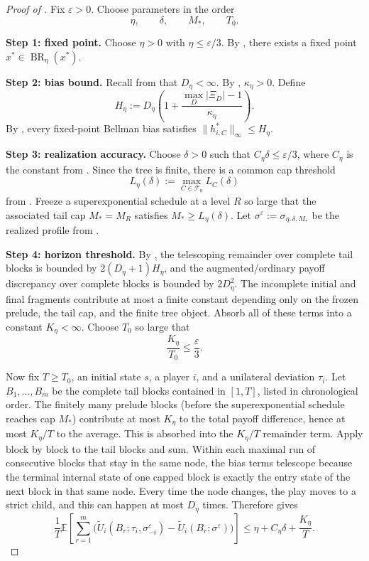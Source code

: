 \documentclass[12pt]{article}
\theoremstyle{definition}
\newcommand{\eps}{\varepsilon}
\newcommand{\E}{\mathbb{E}}
\newcommand{\1}{\mathbf{1}}
\newcommand{\cT}{\mathcal{T}}
\DeclareMathOperator{\BR}{BR}
\begin{document}
\begin{proof}[Proof of ]
Fix $\eps>0$. Choose parameters in the order
\[
\eta,\qquad \delta,\qquad M_*,\qquad T_0.
\]

\smallskip
\noindent\textbf{Step 1: fixed point.}
Choose $\eta>0$ with $\eta\le \eps/3$. By
, there exists a fixed point $x^*\in\BR_\eta(x^*)$.

\smallskip
\noindent\textbf{Step 2: bias bound.}
Recall from  that $D_\eta<\infty$. By
, $\kappa_\eta>0$. Define
\[
H_\eta:=D_\eta\left(1+\frac{\max_D|\Xi_D|-1}{\kappa_\eta}\right).
\]
By , every fixed-point Bellman bias satisfies
$\|h_{i,C}^*\|_\infty\le H_\eta$.

\smallskip
\noindent\textbf{Step 3: realization accuracy.}
Choose $\delta>0$ such that $C_\eta\delta\le \eps/3$, where $C_\eta$ is the
constant from . Since the tree is finite, there is a common
cap threshold
\[
L_\eta(\delta):=\max_{C\in\cT_\eta}L_C(\delta)
\]
from . Freeze a superexponential schedule at a level
$R$ so large that the associated tail cap $M_*=M_R$ satisfies
$M_*\ge L_\eta(\delta)$. Let
$\sigma^\eps:=\sigma_{\eta,\delta,M_*}$ be the realized profile from
.

\smallskip
\noindent\textbf{Step 4: horizon threshold.}
By , the telescoping remainder over complete tail blocks is
bounded by $2(D_\eta+1)H_\eta$, and the augmented/ordinary payoff discrepancy over
complete blocks is bounded by $2D_\eta^2$. The incomplete initial and final
fragments contribute at most a finite constant depending only on the frozen
prelude, the tail cap, and the finite tree object. Absorb all of these terms
into a constant $K_\eta<\infty$.
Choose $T_0$ so large that
\[
\frac{K_\eta}{T_0}\le \frac{\eps}{3}.
\]

Now fix $T\ge T_0$, an initial state $s$, a player $i$, and a unilateral deviation
$\tau_i$. Let $B_1,\dots,B_m$ be the complete tail blocks contained in $[1,T]$,
listed in chronological order. The finitely many prelude blocks (before the
superexponential schedule reaches cap $M_*$) contribute at most $K_\eta$ to the
total payoff difference, hence at most $K_\eta/T$ to the average. This is
absorbed into the $K_\eta/T$ remainder term. Apply  block
by block to the
tail blocks and sum. Within each maximal run of consecutive blocks that stay in
the same node, the bias terms telescope because the terminal internal state of one
capped block is exactly the entry state of the next block in that same node. Every
time the node changes, the play moves to a strict child, and this can happen at
most $D_\eta$ times. Therefore  gives
\[
\frac1T\E\left[\sum_{r=1}^m
\bigl(
\widetilde U_i(B_r;\tau_i,\sigma^\eps_{-i})
-
\widetilde U_i(B_r;\sigma^\eps)
\bigr)\right]
\le
\eta + C_\eta\delta + \frac{K_\eta}{T}.
\]


\end{proof}
\end{document}
